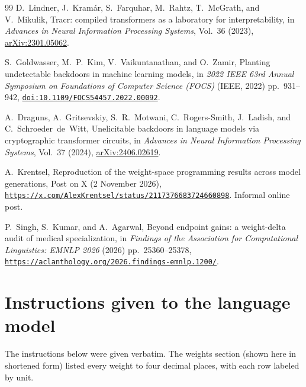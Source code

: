 \documentclass[aps,prx,reprint,superscriptaddress,nofootinbib]{revtex4-2}
\begin{document}
\begin{thebibliography}{99}
D.~Lindner, J.~Kram\'{a}r, S.~Farquhar, M.~Rahtz, T.~McGrath, and V.~Mikulik, Tracr: compiled
transformers as a laboratory for interpretability, in \textit{Advances in Neural Information
Processing Systems}, Vol.~36 (2023), \href{https://arxiv.org/abs/2301.05062}{arXiv:2301.05062}.

S.~Goldwasser, M.~P.~Kim, V.~Vaikuntanathan, and O.~Zamir, Planting undetectable backdoors in
machine learning models, in \textit{2022 IEEE 63rd Annual Symposium on Foundations of Computer
Science (FOCS)} (IEEE, 2022) pp.~\mbox{931--942},
\href{https://doi.org/10.1109/FOCS54457.2022.00092}{\nolinkurl{doi:10.1109/FOCS54457.2022.00092}}.

A.~Draguns, A.~Gritsevskiy, S.~R.~Motwani, C.~Rogers-Smith, J.~Ladish, and C.~Schroeder~de~Witt,
Unelicitable backdoors in language models via cryptographic transformer circuits, in
\textit{Advances in Neural Information Processing Systems}, Vol.~37 (2024),
\href{https://arxiv.org/abs/2406.02619}{arXiv:2406.02619}.

A.~Krentsel, Reproduction of the weight-space programming results across model generations, Post on
X (2 November 2026),
\href{https://x.com/AlexKrentsel/status/2117376683724660898}{\mbox{\nolinkurl{https://x.com/}}\nolinkurl{AlexKrentsel/status/2117376683724660898}}.
Informal online post.

P.~Singh, S.~Kumar, and A.~Agarwal, Beyond endpoint gains: a weight-delta audit of medical
specialization, in \textit{Findings of the Association for Computational Linguistics: EMNLP 2026}
(2026) pp.~\mbox{25360--25378},
\href{https://aclanthology.org/2026.findings-emnlp.1200/}{\mbox{\nolinkurl{https://aclanthology.org/}}\nolinkurl{2026.findings-emnlp.1200/}}.

\end{thebibliography}

\onecolumngrid
\appendix

\section{Instructions given to the language model}\label{app:A}

The instructions below were given verbatim. The weights section (shown here in shortened form)
listed every weight to four decimal places, with each row labeled by unit.
\end{document}
